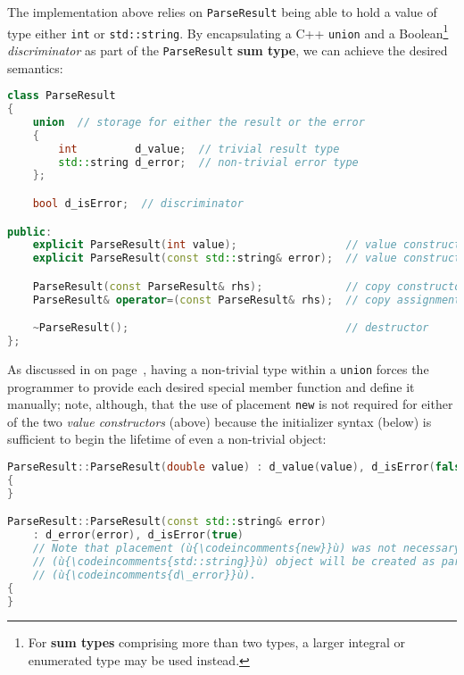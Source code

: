\noindent The implementation above relies on \texttt{ParseResult} being able to
hold a value of type either \texttt{int} or \texttt{std::string}. By
encapsulating a C++ \texttt{union} and a Boolean{\cprotect\footnote{For
\textbf{sum types} comprising more than two types, a larger integral
  or enumerated type may be used instead.}} \emph{discriminator} as part
of the \texttt{ParseResult} \textbf{sum type}, we can achieve the
desired semantics:

\begin{lstlisting}[language=C++]
class ParseResult
{
    union  // storage for either the result or the error
    {
        int         d_value;  // trivial result type
        std::string d_error;  // non-trivial error type
    };

    bool d_isError;  // discriminator

public:
    explicit ParseResult(int value);                 // value constructor (1)
    explicit ParseResult(const std::string& error);  // value constructor (2)

    ParseResult(const ParseResult& rhs);             // copy constructor
    ParseResult& operator=(const ParseResult& rhs);  // copy assignment

    ~ParseResult();                                  // destructor
};
\end{lstlisting}
    
\noindent As discussed in {\it{}} on page~\pageref{unrestrictedunion-description}, having a non-trivial
type within a \texttt{union} forces the programmer to provide each
desired special member function and define it manually; note, although,
that the use of placement \texttt{new} is not required for either of the
two \emph{value constructors} (above) because the initializer syntax
(below) is sufficient to begin the lifetime of even a non-trivial
object:

\begin{lstlisting}[language=C++]
ParseResult::ParseResult(double value) : d_value(value), d_isError(false)
{
}

ParseResult::ParseResult(const std::string& error) 
    : d_error(error), d_isError(true)
    // Note that placement (ù{\codeincomments{new}}ù) was not necessary here because a new 
    // (ù{\codeincomments{std::string}}ù) object will be created as part of the initialization of 
    // (ù{\codeincomments{d\_error}}ù).
{
}
\end{lstlisting}
    

